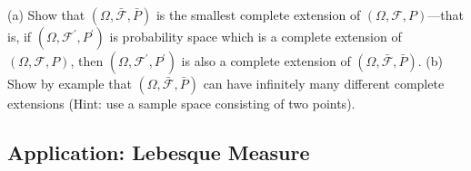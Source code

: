 \begin{exercise}
(a) Show that $(\Omega, \bar{\mathcal F}, \bar P)$ is the smallest complete extension of $(\Omega, \mathcal F, P)$---that is, if $(\Omega, \mathcal F^\prime, P^\prime)$ is probability space which is a complete extension of $(\Omega, \mathcal F, P)$, then $(\Omega, \mathcal F^\prime, P^\prime)$ is also a complete extension of $(\Omega, \bar{\mathcal F}, \bar P)$. (b) Show by example that $(\Omega, \bar{\mathcal F}, \bar P)$ can have infinitely many different complete extensions (Hint: use a sample space consisting of two points).
\end{exercise}






\subsection{Application: Lebesque Measure}






